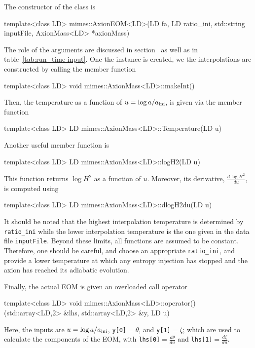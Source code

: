 \documentclass[11pt,a4paper]{article}
\begin{document}
The constructor of the class is
%
\begin{cpp}
	template<class LD>
	mimes::AxionEOM<LD>(LD fa, LD ratio_ini, std::string inputFile, AxionMass<LD> *axionMass)
\end{cpp}
%
The role of the arguments are discussed in section~ as well as in table~\ref{tab:run_time-input}. One the instance is created, we the interpolations are constructed by calling the member function
%
\begin{cpp}
	template<class LD> void mimes::AxionMass<LD>::makeInt()
\end{cpp}
%
Then, the temperature as a function of $u=\log a/a_{\rm ini}{}$, is given via the member function 
%
\begin{cpp}
	template<class LD> LD mimes::AxionMass<LD>::Temperature(LD u)
\end{cpp}
%
Another useful member function is  
%
\begin{cpp}
	template<class LD> LD mimes::AxionMass<LD>::logH2(LD u)
\end{cpp}
%
This function returns $\log H^2$  as a function of $u$. Moreover, its derivative, $\frac{d \log H^2}{du}$, is computed using 
%
\begin{cpp}
	template<class LD> LD mimes::AxionMass<LD>::dlogH2du(LD u)
\end{cpp}
%
It should be noted that the highest interpolation temperature is determined by {\tt ratio\_ini} while the lower interpolation temperature is the one given in the data file {\tt inputFile}. Beyond these limits, all functions are assumed to be constant. Therefore, one should be careful, and choose an appropriate {\tt ratio\_ini}, and provide a lower temperature at which any entropy injection has stopped and the axion has reached its adiabatic evolution.


Finally, the actual EOM is given an overloaded call operator
%
\begin{cpp}
	template<class LD> 
	void mimes::AxionMass<LD>::operator()(std::array<LD,2> &lhs, std::array<LD,2> &y, LD u)
\end{cpp}
%
Here, the inputs are $u=\log a/a_{\rm ini}{}$, {\tt y[0]}$=\theta$, and {\tt y[1]}$=\zeta$; which are used to calculate the components of the EOM, with {\tt lhs[0]}$=\frac{d \theta}{d u}$ and {\tt lhs[1]}$=\frac{d \zeta}{d u}$.
\end{document}
